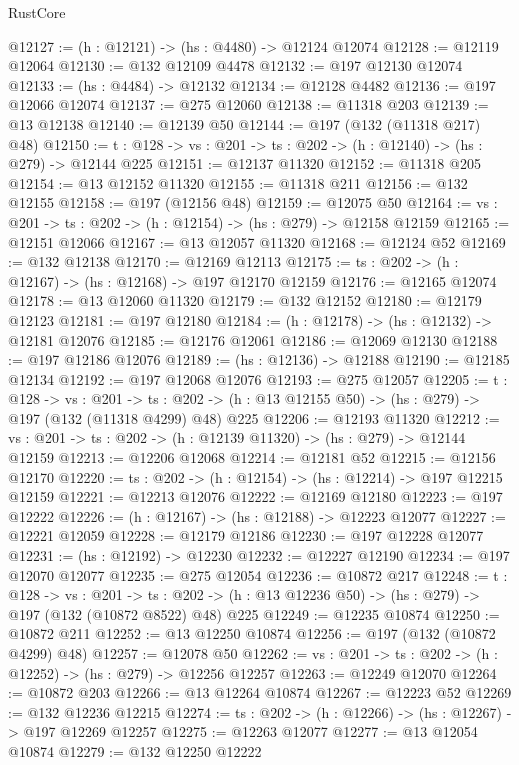 \begin{lexlean}{RustCore}
\begin{coremodule}
@12127 := (h : @12121) -> (hs : @4480) -> @12124 @12074
@12128 := @12119 @12064
@12130 := @132 @12109 @4478
@12132 := @197 @12130 @12074
@12133 := (hs : @4484) -> @12132
@12134 := @12128 @4482
@12136 := @197 @12066 @12074
@12137 := @275 @12060
@12138 := @11318 @203
@12139 := @13 @12138
@12140 := @12139 @50
@12144 := @197 (@132 (@11318 @217) @48)
@12150 := {t : @128} -> {vs : @201} -> {ts : @202} -> (h : @12140) -> (hs : @279) -> @12144 @225
@12151 := @12137 @11320
@12152 := @11318 @205
@12154 := @13 @12152 @11320
@12155 := @11318 @211
@12156 := @132 @12155
@12158 := @197 (@12156 @48)
@12159 := @12075 @50
@12164 := {vs : @201} -> {ts : @202} -> (h : @12154) -> (hs : @279) -> @12158 @12159
@12165 := @12151 @12066
@12167 := @13 @12057 @11320
@12168 := @12124 @52
@12169 := @132 @12138
@12170 := @12169 @12113
@12175 := {ts : @202} -> (h : @12167) -> (hs : @12168) -> @197 @12170 @12159
@12176 := @12165 @12074
@12178 := @13 @12060 @11320
@12179 := @132 @12152
@12180 := @12179 @12123
@12181 := @197 @12180
@12184 := (h : @12178) -> (hs : @12132) -> @12181 @12076
@12185 := @12176 @12061
@12186 := @12069 @12130
@12188 := @197 @12186 @12076
@12189 := (hs : @12136) -> @12188
@12190 := @12185 @12134
@12192 := @197 @12068 @12076
@12193 := @275 @12057
@12205 := {t : @128} ->
  {vs : @201} ->
  {ts : @202} -> (h : @13 @12155 @50) -> (hs : @279) -> @197 (@132 (@11318 @4299) @48) @225
@12206 := @12193 @11320
@12212 := {vs : @201} -> {ts : @202} -> (h : @12139 @11320) -> (hs : @279) -> @12144 @12159
@12213 := @12206 @12068
@12214 := @12181 @52
@12215 := @12156 @12170
@12220 := {ts : @202} -> (h : @12154) -> (hs : @12214) -> @197 @12215 @12159
@12221 := @12213 @12076
@12222 := @12169 @12180
@12223 := @197 @12222
@12226 := (h : @12167) -> (hs : @12188) -> @12223 @12077
@12227 := @12221 @12059
@12228 := @12179 @12186
@12230 := @197 @12228 @12077
@12231 := (hs : @12192) -> @12230
@12232 := @12227 @12190
@12234 := @197 @12070 @12077
@12235 := @275 @12054
@12236 := @10872 @217
@12248 := {t : @128} ->
  {vs : @201} ->
  {ts : @202} -> (h : @13 @12236 @50) -> (hs : @279) -> @197 (@132 (@10872 @8522) @48) @225
@12249 := @12235 @10874
@12250 := @10872 @211
@12252 := @13 @12250 @10874
@12256 := @197 (@132 (@10872 @4299) @48)
@12257 := @12078 @50
@12262 := {vs : @201} -> {ts : @202} -> (h : @12252) -> (hs : @279) -> @12256 @12257
@12263 := @12249 @12070
@12264 := @10872 @203
@12266 := @13 @12264 @10874
@12267 := @12223 @52
@12269 := @132 @12236 @12215
@12274 := {ts : @202} -> (h : @12266) -> (hs : @12267) -> @197 @12269 @12257
@12275 := @12263 @12077
@12277 := @13 @12054 @10874
@12279 := @132 @12250 @12222

\end{coremodule}
\end{lexlean}
